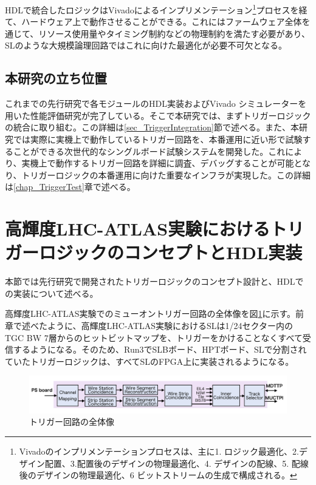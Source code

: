 HDLで統合したロジックはVivadoによるインプリメンテーション\footnote{Vivadoのインプリメンテーションプロセスは、主に1. ロジック最適化、2.デザイン配置、3.配置後のデザインの物理最適化、4. デザインの配線、5. 配線後のデザインの物理最適化、6 ビットストリームの生成で構成される。}プロセスを経て、ハードウェア上で動作させることができる。これにはファームウェア全体を通じて、リソース使用量やタイミング制約などの物理制約を満たす必要があり、SLのような大規模論理回路ではこれに向けた最適化が必要不可欠となる。

\subsection*{本研究の立ち位置}
これまでの先行研究で各モジュールのHDL実装およびVivado シミュレーターを用いた性能評価研究が完了している。そこで本研究では、まずトリガーロジックの統合に取り組む。この詳細は\ref{sec_TriggerIntegration}節で述べる。また、本研究では実際に実機上で動作しているトリガー回路を、本番運用に近い形で試験することができる次世代的なシングルボード試験システムを開発した。これにより、実機上で動作するトリガー回路を詳細に調査、デバッグすることが可能となり、トリガーロジックの本番運用に向けた重要なインフラが実現した。この詳細は\ref{chap_TriggerTest}章で述べる。

\section{高輝度LHC-ATLAS実験におけるトリガーロジックのコンセプトとHDL実装}
\label{sec_Phase2TriggerLogic}
本節では先行研究で開発されたトリガーロジックのコンセプト設計と、HDLでの実装について述べる。

高輝度LHC-ATLAS実験でのミューオントリガー回路の全体像を図\ref{Trigger_over}に示す。前章で述べたように、高輝度LHC-ATLAS実験におけるSLは1/24セクター内のTGC BW 7層からのヒットビットマップを、トリガーをかけることなくすべて受信するようになる。そのため、Run3でSLBボード、HPTボード、SLで分割されていたトリガーロジックは、すべてSLのFPGA上に実装されるようになる。

\begin{figure} 
\centering
\includegraphics[width=16cm]{fig/SL/Trigger_over.png}
\caption[トリガー回路の全体像]{トリガー回路の全体像}
\label{Trigger_over}
\end{figure}

